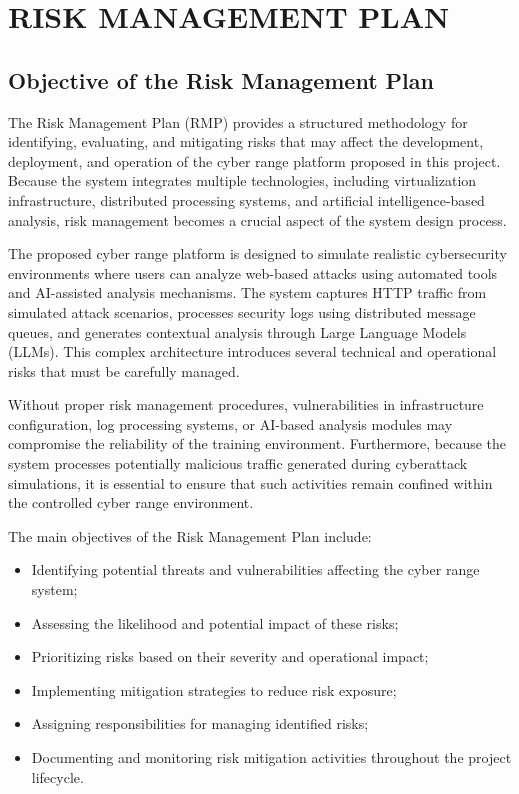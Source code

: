 \chapter{RISK MANAGEMENT PLAN}

\section{Objective of the Risk Management Plan}
The Risk Management Plan (RMP) provides a structured methodology for identifying, evaluating, and mitigating risks that may affect the development, deployment, and operation of the cyber range platform proposed in this project. Because the system integrates multiple technologies, including virtualization infrastructure, distributed processing systems, and artificial intelligence-based analysis, risk management becomes a crucial aspect of the system design process.

The proposed cyber range platform is designed to simulate realistic cybersecurity environments where users can analyze web-based attacks using automated tools and AI-assisted analysis mechanisms. The system captures HTTP traffic from simulated attack scenarios, processes security logs using distributed message queues, and generates contextual analysis through Large Language Models (LLMs). This complex architecture introduces several technical and operational risks that must be carefully managed.

Without proper risk management procedures, vulnerabilities in infrastructure configuration, log processing systems, or AI-based analysis modules may compromise the reliability of the training environment. Furthermore, because the system processes potentially malicious traffic generated during cyberattack simulations, it is essential to ensure that such activities remain confined within the controlled cyber range environment.

The main objectives of the Risk Management Plan include:
\begin{itemize}
    \item Identifying potential threats and vulnerabilities affecting the cyber range system;
    \item Assessing the likelihood and potential impact of these risks;
    \item Prioritizing risks based on their severity and operational impact;
    \item Implementing mitigation strategies to reduce risk exposure;
    \item Assigning responsibilities for managing identified risks;
    \item Documenting and monitoring risk mitigation activities throughout the project lifecycle.
\end{itemize}

